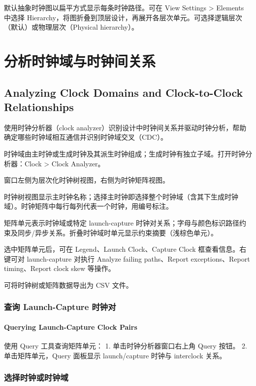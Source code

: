 默认抽象时钟图以扁平方式显示每条时钟路径。可在 View Settings > Elements 中选择 Hierarchy，将图折叠到顶层设计，再展开各层次单元。可选择逻辑层次（默认）或物理层次（Physical hierarchy）。

\section{分析时钟域与时钟间关系}
\subsection*{Analyzing Clock Domains and Clock-to-Clock Relationships}

使用时钟分析器（clock analyzer）识别设计中时钟间关系并驱动时钟分析，帮助确定哪些时钟域相互通信并识别时钟域交叉（CDC）。

时钟域由主时钟或生成时钟及其派生时钟组成；生成时钟有独立子域。打开时钟分析器：Clock > Clock Analyzer。

窗口左侧为层次化时钟树视图，右侧为时钟矩阵视图。

时钟树视图显示主时钟名称；选择主时钟即选择整个时钟域（含其下生成时钟域）。时钟矩阵中每行每列代表一个时钟，用编号标注。

矩阵单元表示时钟域或特定 launch-capture 时钟对关系；字母与颜色标识路径约束及同步/异步关系。折叠时钟域时单元显示约束摘要（浅棕色单元）。

选中矩阵单元后，可在 Legend、Launch Clock、Capture Clock 框查看信息。右键可对 launch-capture 对执行 Analyze failing paths、Report exceptions、Report timing、Report clock skew 等操作。

可将时钟树或矩阵数据导出为 CSV 文件。

\subsubsection{查询 Launch-Capture 时钟对}
\paragraph*{Querying Launch-Capture Clock Pairs}

使用 Query 工具查询矩阵单元：
1. 单击时钟分析器窗口右上角 Query 按钮。
2. 单击矩阵单元，Query 面板显示 launch/capture 时钟与 interclock 关系。

\subsubsection{选择时钟或时钟域}
